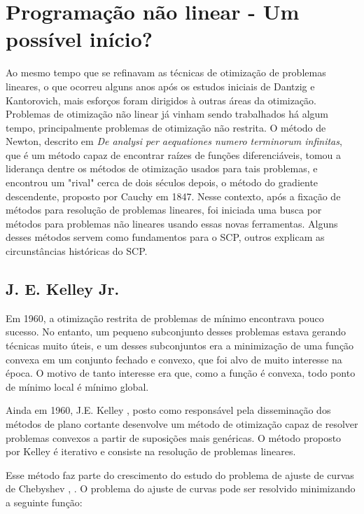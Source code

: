 \section{Programação não linear - Um possível início?}
\label{secao_historia}

Ao mesmo tempo que se refinavam as técnicas de otimização de problemas lineares, o que ocorreu
alguns anos após os estudos iniciais de Dantzig e Kantorovich, mais esforços foram dirigidos à
outras áreas da otimização. Problemas de otimização não linear já vinham sendo trabalhados
há algum tempo, principalmente problemas de otimização não restrita. O método de Newton, descrito
em \textit{De analysi per aequationes numero terminorum infinitas}, que é um método capaz de encontrar
raízes de funções diferenciáveis, tomou a liderança dentre os métodos de otimização usados para
tais problemas, e encontrou um "rival" cerca de dois séculos depois, o método do gradiente
descendente, proposto por Cauchy \cite{lemarechal2012cauchy} em 1847. Nesse contexto, após
a fixação de métodos para resolução de problemas lineares, foi iniciada uma busca por métodos para
problemas não lineares usando essas novas ferramentas. Alguns desses métodos servem como fundamentos
para o SCP, outros explicam as circunstâncias históricas do SCP.

\subsection{J. E. Kelley Jr.}

Em 1960, a otimização restrita de problemas de mínimo encontrava pouco sucesso. No
entanto, um pequeno subconjunto desses problemas estava gerando técnicas muito úteis, e um desses
subconjuntos era a minimização de uma função convexa em um conjunto fechado e convexo, que foi
alvo de muito interesse na época. O motivo de tanto interesse era que, como a função é convexa,
todo ponto de mínimo local é mínimo global.

Ainda em 1960, J.E. Kelley \cite{kelley1960cutting}, posto como responsável pela disseminação dos
métodos de plano cortante desenvolve um método de otimização capaz de resolver problemas convexos
a partir de suposições mais genéricas. O método proposto por Kelley é iterativo e consiste na
resolução de problemas lineares.

Esse método faz parte do crescimento do estudo do problema de ajuste de curvas de Chebyshev
\cite{kelley1959computational}, \cite{kelley1958application}. O problema do ajuste de curvas pode
ser resolvido minimizando a seguinte função:


